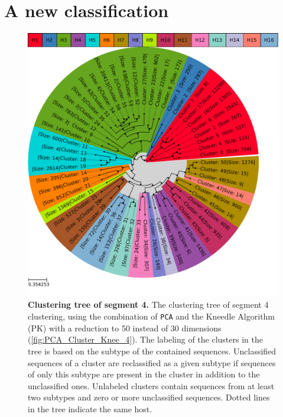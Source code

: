 \section{A new classification} \label{sec:Serotype_Classification}

\begin{figure}[!hbt]
    \centering
    \includegraphics[width=\textwidth]{Results/Clustertree_Segment_4.pdf}
    \caption[Clustering tree of segment 4]{\textbf{Clustering tree of segment 4.} The clustering tree of segment 4 clustering, using the combination of \texttt{PCA} and the Kneedle Algorithm (PK) with a reduction to 50 instead of 30 dimensions (\autoref{fig:PCA_Cluster_Knee_4}). The labeling of the clusters in the tree is based on the subtype of the contained sequences. Unclassified sequences of a cluster are reclassified as a given subtype if sequences of only this subtype are present in the cluster in addition to the unclassified ones. Unlabeled clusters contain sequences from at least two subtypes and zero or more unclassified sequences. Dotted lines in the tree indicate the same host.}
    \label{fig:Result_Clustertree_Segment_4}
\end{figure}

